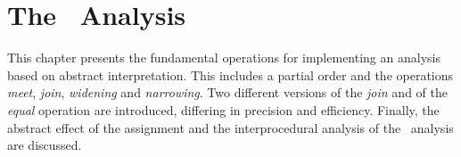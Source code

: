 \chapter{The \cpo\ Analysis}\label{chapter:analysis}

This chapter presents the fundamental operations for implementing an analysis based on abstract interpretation.
This includes a partial order and the operations \emph{meet}, \emph{join}, \emph{widening} and \emph{narrowing}.
Two different versions of the \emph{join} and of the \emph{equal} operation are introduced,
differing in precision and efficiency.
Finally, the abstract effect of the assignment and the interprocedural analysis of the \cpo\ analysis are discussed.





